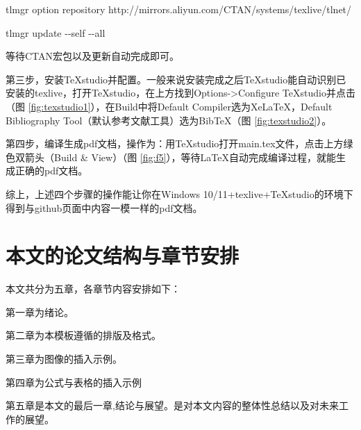 \noindent tlmgr option repository http://mirrors.aliyun.com/CTAN/systems/texlive/tlnet/

\noindent tlmgr update $ \text{-}\text{-} $self $ \text{-}\text{-} $all

\noindent 等待CTAN宏包以及更新自动完成即可。


第三步，安装TeXstudio并配置。一般来说安装完成之后TeXstudio能自动识别已安装的texlive，打开TeXstudio，在上方找到Options->Configure TeXstudio并点击（图 \ref{fig:texstudio1}），在Build中将Default Compiler选为XeLaTeX，Default Bibliography Tool（默认参考文献工具）选为BibTeX（图 \ref{fig:texstudio2}）。



第四步，编译生成pdf文档，操作为：用TeXstudio打开main.tex文件，点击上方绿色双箭头（Build \& View）（图 \ref{fig:f5}），等待LaTeX自动完成编译过程，就能生成正确的pdf文档。


综上，上述四个步骤的操作能让你在Windows 10/11+texlive+TeXstudio的环境下得到与github页面中内容一模一样的pdf文档。

\section{本文的论文结构与章节安排}
\label{sec:arrangement}
本文共分为五章，各章节内容安排如下：

第一章为绪论。

第二章为本模板遵循的排版及格式。

第三章为图像的插入示例。

第四章为公式与表格的插入示例

第五章是本文的最后一章,结论与展望。是对本文内容的整体性总结以及对未来工作的展望。

